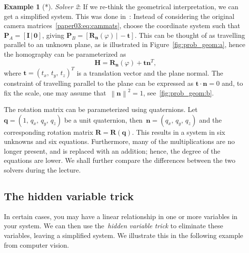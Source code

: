 \documentclass[11pt,a4paper]{article}
\theoremstyle{definition}
\newtheorem{example}{Example}
\renewcommand{\phi}{\varphi}
\newcommand{\T}{T}
\newcommand{\mat}[1]{\bm{#1}}
\newcommand{\norm}[1]{\left\|#1\right\|}
\begin{document}
\begin{example}[*]
\emph{Solver 2}: If we re-think the geometrical interpretation, we can get a simplified system.
This was done in~\cite{valtonenoernhag-icpram-2019}:
Instead of considering the original camera matrices~\eqref{paper03:eq:cammats}, choose
the coordinate system such that
\mbox{$\mat{P}_A = [\mat{I}\,|\,\mat{0}]$},
giving $\mat{P}_B = [\mat{R}_{\mat{n}}(\phi)\,|\,-\mat{t}]$. This can be thought of
as travelling parallel to an unknown plane, as is illustrated in Figure~\ref{fig:prob_geom:a},
hence the homography can be parameterized as
\begin{equation}\label{paper03:eq:h}
    \mat{H}= \mat{R}_{\mat{n}}(\phi)+\mat{t}\mat{n}^{ \T},
\end{equation}
where $\mat{t}=(t_x,\,t_y,\,t_z)^{\T}$ is a translation vector and
\mbox{\smash {$\mat{n}=(n_x,\, n_y,\, n_z)^{\T}$}} the plane normal.
The constraint of travelling parallel
to the plane can be expressed as $\mat{t}\cdot\mat{n} = 0$ and, to fix the scale, one may
assume that~$\norm{\mat{n}}^2=1$, see~\cref{fig:prob_geom:b}.

The rotation matrix can be parameterized using quaternions. Let~$\mat{q}=(1,\,q_x,\,q_y,\,q_z)$
be a unit quaternion, then~$\mat{n}=(q_x,\,q_y,\,q_z)$
and the corresponding rotation matrix \mbox{$\mat{R}=\mat{R}(\mat{q})$}.
This results in a system in six unknowns and six equations. Furthermore, many of the multiplications
are no longer present, and is replaced with an addition; hence, the degree of the equations are
lower. We shall further compare the differences between the two solvers during the lecture.
\end{example}

\subsection{The hidden variable trick}
In certain cases, you may have a linear relationship in one or more variables in your system.
We can then use the~\emph{hidden variable trick} to eliminate these variables,
leaving a simplified system. We illustrate this in the following example from computer vision.
\end{document}
